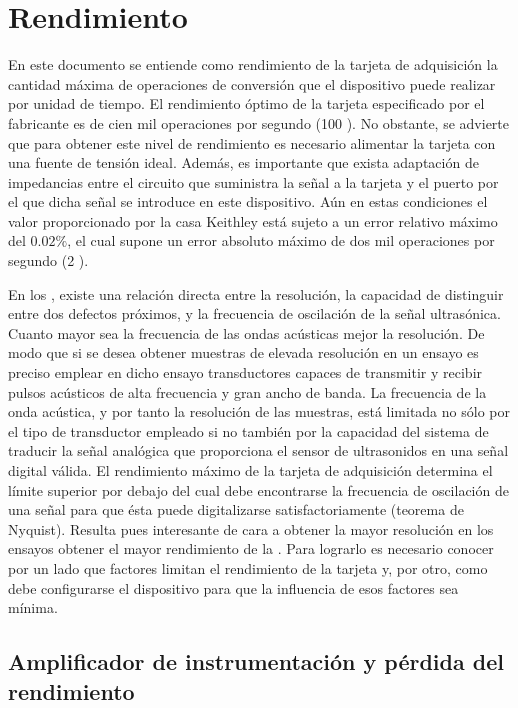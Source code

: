 \section{Rendimiento}\label{sec:throughput}

En este documento se entiende como rendimiento de la tarjeta de adquisición
la cantidad máxima de operaciones de conversión que el dispositivo puede
realizar por unidad de tiempo. El rendimiento óptimo de la tarjeta \kpci{}
especificado por el fabricante es de cien mil operaciones por segundo (100
\kms{}). No obstante, se advierte que para obtener este nivel de
rendimiento es necesario alimentar la tarjeta con una fuente de tensión
ideal. Además, es importante que exista adaptación de impedancias entre el
circuito que suministra la señal a la tarjeta y el puerto por el que dicha
señal se introduce en este dispositivo. Aún en estas condiciones el valor
proporcionado por la casa Keithley está sujeto a un error relativo máximo
del $0.02\%$, el cual supone un error absoluto máximo de dos mil
operaciones por segundo (2 \kms{}).

En los , existe una relación directa entre la resolución, la
capacidad de distinguir entre dos defectos próximos, y la frecuencia de
oscilación de la señal ultrasónica. Cuanto mayor sea la frecuencia de las
ondas acústicas mejor la resolución. De modo que si se desea obtener
muestras de elevada resolución en un ensayo es preciso emplear en dicho
ensayo transductores capaces de transmitir y recibir pulsos acústicos de
alta frecuencia y gran ancho de banda. La frecuencia de la onda acústica, y
por tanto la resolución de las muestras, está limitada no sólo por el tipo
de transductor empleado si no también por la capacidad del sistema de
traducir la señal analógica que proporciona el sensor de ultrasonidos en
una señal digital válida. El rendimiento máximo de la tarjeta de
adquisición determina el límite superior por debajo del cual debe
encontrarse la frecuencia de oscilación de una señal para que ésta puede
digitalizarse satisfactoriamente (teorema de Nyquist). Resulta pues
interesante de cara a obtener la mayor resolución en los ensayos obtener el
mayor rendimiento de la \kpci{}. Para lograrlo es necesario conocer por un
lado que factores limitan el rendimiento de la tarjeta y, por otro, como
debe configurarse el dispositivo para que la influencia de esos factores
sea mínima.


\subsection[El amplificador de instrumentación] {Amplificador de
instrumentación y pérdida del rendimiento}

